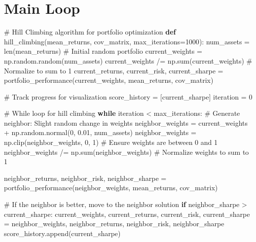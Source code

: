 \documentclass[
  letterpaper,
  DIV=11,
  numbers=noendperiod]{scrreprt}
\newenvironment{Shaded}{\begin{snugshade}}{\end{snugshade}}
\newcommand{\BuiltInTok}[1]{\textcolor[rgb]{0.00,0.23,0.31}{#1}}
\newcommand{\CommentTok}[1]{\textcolor[rgb]{0.37,0.37,0.37}{#1}}
\newcommand{\ControlFlowTok}[1]{\textcolor[rgb]{0.00,0.23,0.31}{\textbf{#1}}}
\newcommand{\DecValTok}[1]{\textcolor[rgb]{0.68,0.00,0.00}{#1}}
\newcommand{\FloatTok}[1]{\textcolor[rgb]{0.68,0.00,0.00}{#1}}
\newcommand{\KeywordTok}[1]{\textcolor[rgb]{0.00,0.23,0.31}{\textbf{#1}}}
\newcommand{\NormalTok}[1]{\textcolor[rgb]{0.00,0.23,0.31}{#1}}
\newcommand{\OperatorTok}[1]{\textcolor[rgb]{0.37,0.37,0.37}{#1}}
\begin{document}
\section{Main Loop}\label{main-loop-2}

\begin{Shaded}
\begin{Highlighting}[]
\CommentTok{\# Hill Climbing algorithm for portfolio optimization}
\KeywordTok{def}\NormalTok{ hill\_climbing(mean\_returns, cov\_matrix, max\_iterations}\OperatorTok{=}\DecValTok{1000}\NormalTok{):}
\NormalTok{    num\_assets }\OperatorTok{=} \BuiltInTok{len}\NormalTok{(mean\_returns)}
    \CommentTok{\# Initial random portfolio}
\NormalTok{    current\_weights }\OperatorTok{=}\NormalTok{ np.random.random(num\_assets)}
\NormalTok{    current\_weights }\OperatorTok{/=}\NormalTok{ np.}\BuiltInTok{sum}\NormalTok{(current\_weights)  }\CommentTok{\# Normalize to sum to 1}
\NormalTok{    current\_returns, current\_risk, current\_sharpe }\OperatorTok{=}\NormalTok{ portfolio\_performance(current\_weights, mean\_returns, cov\_matrix)}
    
    \CommentTok{\# Track progress for visualization}
\NormalTok{    score\_history }\OperatorTok{=}\NormalTok{ [current\_sharpe]}
\NormalTok{    iteration }\OperatorTok{=} \DecValTok{0}

    \CommentTok{\# While loop for hill climbing}
    \ControlFlowTok{while}\NormalTok{ iteration }\OperatorTok{\textless{}}\NormalTok{ max\_iterations:}
        \CommentTok{\# Generate neighbor: Slight random change in weights}
\NormalTok{        neighbor\_weights }\OperatorTok{=}\NormalTok{ current\_weights }\OperatorTok{+}\NormalTok{ np.random.normal(}\DecValTok{0}\NormalTok{, }\FloatTok{0.01}\NormalTok{, num\_assets)}
\NormalTok{        neighbor\_weights }\OperatorTok{=}\NormalTok{ np.clip(neighbor\_weights, }\DecValTok{0}\NormalTok{, }\DecValTok{1}\NormalTok{)  }\CommentTok{\# Ensure weights are between 0 and 1}
\NormalTok{        neighbor\_weights }\OperatorTok{/=}\NormalTok{ np.}\BuiltInTok{sum}\NormalTok{(neighbor\_weights)  }\CommentTok{\# Normalize weights to sum to 1}
        
\NormalTok{        neighbor\_returns, neighbor\_risk, neighbor\_sharpe }\OperatorTok{=}\NormalTok{ portfolio\_performance(neighbor\_weights, mean\_returns, cov\_matrix)}
        
        \CommentTok{\# If the neighbor is better, move to the neighbor solution}
        \ControlFlowTok{if}\NormalTok{ neighbor\_sharpe }\OperatorTok{\textgreater{}}\NormalTok{ current\_sharpe:}
\NormalTok{            current\_weights, current\_returns, current\_risk, current\_sharpe }\OperatorTok{=}\NormalTok{ neighbor\_weights, neighbor\_returns, neighbor\_risk, neighbor\_sharpe}
\NormalTok{            score\_history.append(current\_sharpe)}
        

\end{Highlighting}
\end{Shaded}
\end{document}
